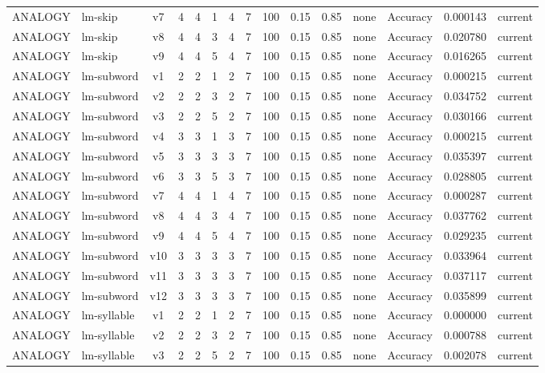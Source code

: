 \documentclass{article}
\begin{document}
\begin{xltabular}{\linewidth}{@{}lYcrrrrrrrrYlrl@{}}
ANALOGY & lm-skip & v7 & 4 & 4 & 1 & 4 & 7 & 100 & 0.15 & 0.85 & none & Accuracy & 0.000143 & current \\
ANALOGY & lm-skip & v8 & 4 & 4 & 3 & 4 & 7 & 100 & 0.15 & 0.85 & none & Accuracy & 0.020780 & current \\
ANALOGY & lm-skip & v9 & 4 & 4 & 5 & 4 & 7 & 100 & 0.15 & 0.85 & none & Accuracy & 0.016265 & current \\
ANALOGY & lm-subword & v1 & 2 & 2 & 1 & 2 & 7 & 100 & 0.15 & 0.85 & none & Accuracy & 0.000215 & current \\
ANALOGY & lm-subword & v2 & 2 & 2 & 3 & 2 & 7 & 100 & 0.15 & 0.85 & none & Accuracy & 0.034752 & current \\
ANALOGY & lm-subword & v3 & 2 & 2 & 5 & 2 & 7 & 100 & 0.15 & 0.85 & none & Accuracy & 0.030166 & current \\
ANALOGY & lm-subword & v4 & 3 & 3 & 1 & 3 & 7 & 100 & 0.15 & 0.85 & none & Accuracy & 0.000215 & current \\
ANALOGY & lm-subword & v5 & 3 & 3 & 3 & 3 & 7 & 100 & 0.15 & 0.85 & none & Accuracy & 0.035397 & current \\
ANALOGY & lm-subword & v6 & 3 & 3 & 5 & 3 & 7 & 100 & 0.15 & 0.85 & none & Accuracy & 0.028805 & current \\
ANALOGY & lm-subword & v7 & 4 & 4 & 1 & 4 & 7 & 100 & 0.15 & 0.85 & none & Accuracy & 0.000287 & current \\
ANALOGY & lm-subword & v8 & 4 & 4 & 3 & 4 & 7 & 100 & 0.15 & 0.85 & none & Accuracy & 0.037762 & current \\
ANALOGY & lm-subword & v9 & 4 & 4 & 5 & 4 & 7 & 100 & 0.15 & 0.85 & none & Accuracy & 0.029235 & current \\
ANALOGY & lm-subword & v10 & 3 & 3 & 3 & 3 & 7 & 100 & 0.15 & 0.85 & none & Accuracy & 0.033964 & current \\
ANALOGY & lm-subword & v11 & 3 & 3 & 3 & 3 & 7 & 100 & 0.15 & 0.85 & none & Accuracy & 0.037117 & current \\
ANALOGY & lm-subword & v12 & 3 & 3 & 3 & 3 & 7 & 100 & 0.15 & 0.85 & none & Accuracy & 0.035899 & current \\
ANALOGY & lm-syllable & v1 & 2 & 2 & 1 & 2 & 7 & 100 & 0.15 & 0.85 & none & Accuracy & 0.000000 & current \\
ANALOGY & lm-syllable & v2 & 2 & 2 & 3 & 2 & 7 & 100 & 0.15 & 0.85 & none & Accuracy & 0.000788 & current \\
ANALOGY & lm-syllable & v3 & 2 & 2 & 5 & 2 & 7 & 100 & 0.15 & 0.85 & none & Accuracy & 0.002078 & current \\

\end{xltabular}
\end{document}
